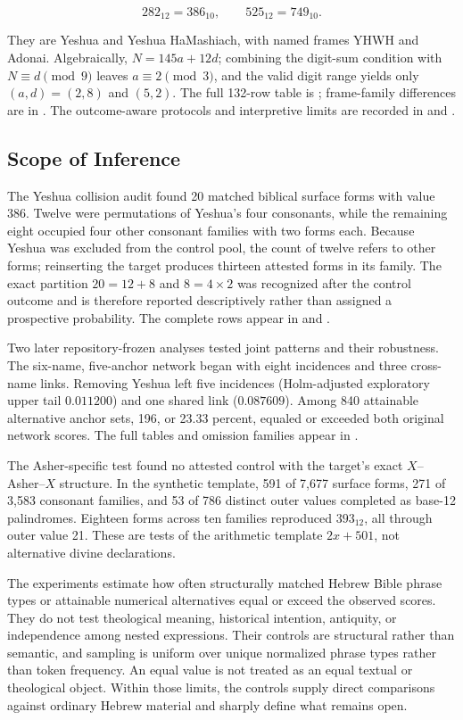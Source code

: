 \[
282_{12}=386_{10},
\qquad
525_{12}=749_{10}.
\]

They are Yeshua and Yeshua HaMashiach, with named frames YHWH and Adonai. Algebraically, $N=145a+12d$; combining the digit-sum condition with $N\equiv d\pmod 9$ leaves $a\equiv2\pmod 3$, and the valid digit range yields only $(a,d)=(2,8)$ and $(5,2)$. The full 132-row table is ; frame-family differences are in . The outcome-aware protocols and interpretive limits are recorded in  and .

\subsection{Scope of Inference}

The Yeshua collision audit found 20 matched biblical surface forms with value 386. Twelve were permutations of Yeshua's four consonants, while the remaining eight occupied four other consonant families with two forms each. Because Yeshua was excluded from the control pool, the count of twelve refers to other forms; reinserting the target produces thirteen attested forms in its family. The exact partition $20=12+8$ and $8=4\times2$ was recognized after the control outcome and is therefore reported descriptively rather than assigned a prospective probability. The complete rows appear in  and .

Two later repository-frozen analyses tested joint patterns and their robustness. The six-name, five-anchor network began with eight incidences and three cross-name links. Removing Yeshua left five incidences (Holm-adjusted exploratory upper tail $0.011200$) and one shared link ($0.087609$). Among 840 attainable alternative anchor sets, 196, or 23.33 percent, equaled or exceeded both original network scores. The full tables and omission families appear in .

The Asher-specific test found no attested control with the target's exact $X$--Asher--$X$ structure. In the synthetic template, 591 of 7,677 surface forms, 271 of 3,583 consonant families, and 53 of 786 distinct outer values completed as base-12 palindromes. Eighteen forms across ten families reproduced $393_{12}$, all through outer value 21. These are tests of the arithmetic template $2x+501$, not alternative divine declarations.

The experiments estimate how often structurally matched Hebrew Bible phrase types or attainable numerical alternatives equal or exceed the observed scores. They do not test theological meaning, historical intention, antiquity, or independence among nested expressions. Their controls are structural rather than semantic, and sampling is uniform over unique normalized phrase types rather than token frequency. An equal value is not treated as an equal textual or theological object. Within those limits, the controls supply direct comparisons against ordinary Hebrew material and sharply define what remains open.
